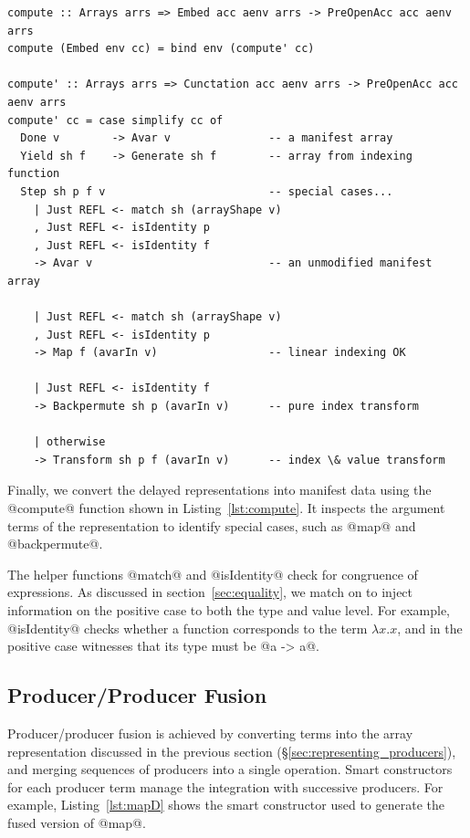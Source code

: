 \begin{lstlisting}[style=haskell_float
    ,label=lst:compute
    ,caption={Computing the delayed representation to a manifest array}]
compute :: Arrays arrs => Embed acc aenv arrs -> PreOpenAcc acc aenv arrs
compute (Embed env cc) = bind env (compute' cc)

compute' :: Arrays arrs => Cunctation acc aenv arrs -> PreOpenAcc acc aenv arrs
compute' cc = case simplify cc of
  Done v        -> Avar v               -- a manifest array
  Yield sh f    -> Generate sh f        -- array from indexing function
  Step sh p f v                         -- special cases...
    | Just REFL <- match sh (arrayShape v)
    , Just REFL <- isIdentity p
    , Just REFL <- isIdentity f
    -> Avar v                           -- an unmodified manifest array

    | Just REFL <- match sh (arrayShape v)
    , Just REFL <- isIdentity p
    -> Map f (avarIn v)                 -- linear indexing OK

    | Just REFL <- isIdentity f
    -> Backpermute sh p (avarIn v)      -- pure index transform

    | otherwise
    -> Transform sh p f (avarIn v)      -- index \& value transform
\end{lstlisting}

Finally, we convert the delayed representations into manifest data using the
@compute@ function shown in Listing~\ref{lst:compute}. It inspects the argument
terms of the representation to identify special cases, such as @map@ and
@backpermute@.

The helper functions @match@ and @isIdentity@ check for congruence of
expressions. As discussed in section~\ref{sec:equality}, we match on  to inject information on the positive case to both the type and value
level. For example, @isIdentity@ checks whether a function corresponds to
the term $\lambda x.x$, and in the positive case witnesses that its type must be
@a -> a@.

\subsection{Producer/Producer Fusion}
\label{sec:producer_producer_fusion}

Producer/producer fusion is achieved by converting terms into the array
representation discussed in the previous section
(\S\ref{sec:representing_producers}), and merging sequences of producers into a
single operation. Smart constructors for each producer term manage the
integration with successive producers. For example, Listing~\ref{lst:mapD} shows
the smart constructor used to generate the fused version of @map@.

